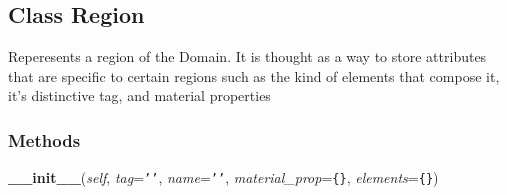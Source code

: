 

\subsection{Class Region}

    \label{Classes:Region}
Reperesents a region of the Domain. It is thought as a way to store 
attributes that are specific to certain regions such as the kind of 
elements that compose it, it's distinctive tag, and material properties



  \subsubsection{Methods}

    \label{Classes:Region:__init__}

    \vspace{0.5ex}

\hspace{.8\funcindent}\begin{boxedminipage}{\funcwidth}

    \raggedright \textbf{\_\_init\_\_}(\textit{self}, \textit{tag}={\tt \texttt{'}\texttt{}\texttt{'}}, \textit{name}={\tt \texttt{'}\texttt{}\texttt{'}}, \textit{material\_prop}={\tt \texttt{\{}\texttt{\}}}, \textit{elements}={\tt \texttt{\{}\texttt{\}}})

\setlength{\parskip}{2ex}
\setlength{\parskip}{1ex}
    \end{boxedminipage}

    \label{Classes:Region:__str__}

    \vspace{0.5ex}


